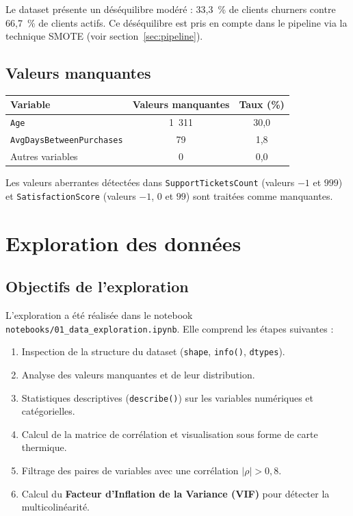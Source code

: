 \documentclass[11pt,a4paper]{article}
\begin{document}
Le dataset présente un déséquilibre modéré : 33,3~\% de clients churners contre 66,7~\% de clients actifs. Ce déséquilibre est pris en compte dans le pipeline via la technique SMOTE (voir section~\ref{sec:pipeline}).

\subsection{Valeurs manquantes}

\begin{center}
\begin{tabular}{lcc}
\toprule
\textbf{Variable} & \textbf{Valeurs manquantes} & \textbf{Taux (\%)} \\
\midrule
\texttt{Age} & 1~311 & 30,0 \\
\texttt{AvgDaysBetweenPurchases} & 79 & 1,8 \\
Autres variables & 0 & 0,0 \\
\bottomrule
\end{tabular}
\end{center}

Les valeurs aberrantes détectées dans \texttt{SupportTicketsCount} (valeurs $-1$ et $999$) et \texttt{SatisfactionScore} (valeurs $-1$, $0$ et $99$) sont traitées comme manquantes.

\section{Exploration des données}

\subsection{Objectifs de l'exploration}

L'exploration a été réalisée dans le notebook \texttt{notebooks/01\_data\_exploration.ipynb}. Elle comprend les étapes suivantes :

\begin{enumerate}[noitemsep]
    \item Inspection de la structure du dataset (\texttt{shape}, \texttt{info()}, \texttt{dtypes}).
    \item Analyse des valeurs manquantes et de leur distribution.
    \item Statistiques descriptives (\texttt{describe()}) sur les variables numériques et catégorielles.
    \item Calcul de la matrice de corrélation et visualisation sous forme de carte thermique.
    \item Filtrage des paires de variables avec une corrélation $|\rho| > 0{,}8$.
    \item Calcul du \textbf{Facteur d'Inflation de la Variance (VIF)} pour détecter la multicolinéarité.
\end{enumerate}
\end{document}

